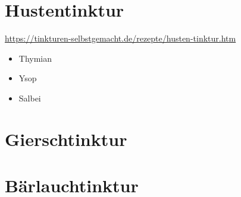 


\newpage


\section{Hustentinktur}
\label{   }


\cite{tinkturen}  

\url{https://tinkturen-selbstgemacht.de/rezepte/husten-tinktur.htm} 

 

\begin{itemize}
	\item Thymian
	\item Ysop
	\item Salbei
\end{itemize}




\newpage


\section{Gierschtinktur}
\label{   }


    





\newpage

\section{Bärlauchtinktur}
\label{   }



